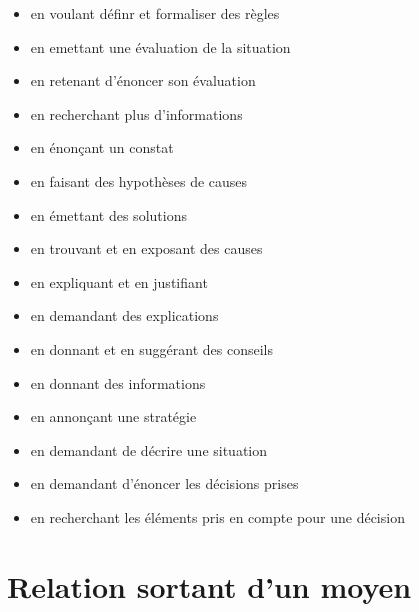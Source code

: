\documentclass[8pt,a4paper]{article}
\begin{document}
\begin{itemize}
\begin{itemize}
\item en voulant définr et formaliser des règles  
\item en emettant une évaluation de la situation  
\item en retenant d'énoncer son évaluation  
\item en recherchant plus d'informations  
\item en énonçant un constat
\item en faisant des hypothèses de causes
\item en émettant des solutions
\item en trouvant et en exposant des causes  
\item en expliquant et en justifiant
\item en demandant des explications
\item en donnant et en suggérant des conseils  
\item en donnant des informations
\item en annonçant une stratégie  
\item en demandant de décrire une situation  
\item en demandant d'énoncer les décisions prises  
\item en recherchant les éléments pris en compte pour une décision
\\ 
 \end{itemize}
\end{itemize}
\section{Relation sortant d'un moyen}
\end{document}
